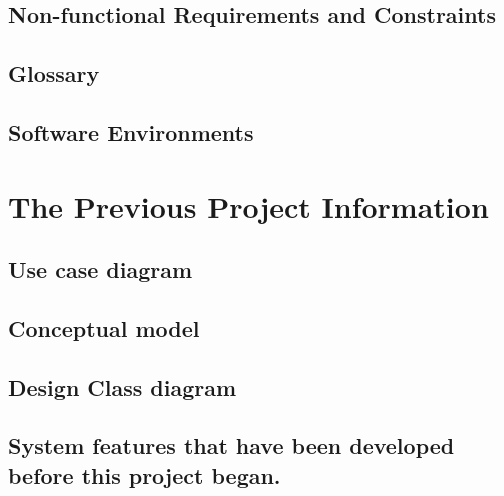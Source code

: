 \documentclass[12pt, a4paper]{article}
\begin{document}
\begin{CJK*}{UTF8}{bkai}
  \subsection{Non-functional Requirements and Constraints}

  \subsection{Glossary}

  \subsection{Software Environments}

\section{The Previous Project Information}
  \subsection{Use case diagram}

  \subsection{Conceptual model}

  \subsection{Design Class diagram}

  \subsection{System features that have been developed before this project began.}
\end{CJK*}
\end{document}

